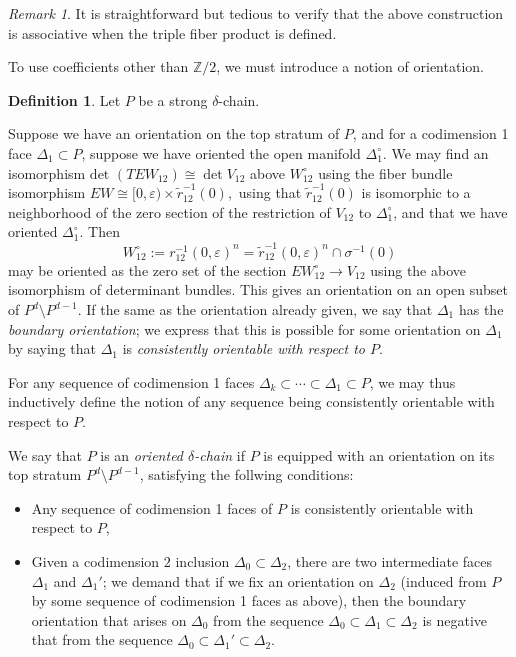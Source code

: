\documentclass{memo-l}
\theoremstyle{definition}
\newtheorem{definition}[theorem]{Definition}
\theoremstyle{remark}
\newtheorem{remark}[theorem]{Remark}
\numberwithin{section}{chapter}
\numberwithin{equation}{chapter}
\begin{document}
\begin{remark}\label{rmk:assoc}
It is straightforward but tedious to verify that the above construction is associative when the triple fiber product is defined. 
\end{remark}

To use coefficients other than $\mathbb Z/2$, we must introduce a notion of orientation.
\begin{definition}Let $P$ be a strong $\delta$-chain.

Suppose we have an orientation on the top stratum of $P$, and for a codimension 1 face $\Delta_1 \subset P$, suppose we have oriented the open manifold $\Delta_1^\circ$. We may find an isomorphism $\text{det }(TEW_{12}) \cong \det{V_{12}}$ above $W_{12}^\circ$ using the fiber bundle isomorphism $EW \cong [0,\varepsilon) \times \tilde r_{12}^{-1}(0),$ using that $\tilde r_{12}^{-1}(0)$ is isomorphic to a neighborhood of the zero section of the restriction of $V_{12}$ to $\Delta_1^\circ$, and that we have oriented $\Delta_1^\circ$. Then
$$W_{12}^\circ := r_{12}^{-1}(0, \varepsilon)^n = \tilde r_{12}^{-1}(0, \varepsilon)^n \cap \sigma^{-1}(0)$$
may be oriented as the zero set of the section $EW_{12}^\circ \to V_{12}$ using the above isomorphism of determinant bundles. This gives an orientation on an open subset of $P^d \setminus P^{d-1}$. If the same as the orientation already given, we say that $\Delta_1$ has the \emph{boundary orientation}; we express that this is possible for some orientation on $\Delta_1$ by saying that $\Delta_1$ is \emph{consistently orientable with respect to $P$}.

For any sequence of codimension 1 faces $\Delta_k \subset \cdots \subset \Delta_1 \subset P$, we may thus inductively define the notion of any sequence being consistently orientable with respect to $P$. 

We say that $P$ is an \emph{oriented $\delta$-chain} if $P$ is equipped with an orientation on its top stratum $P^d \setminus P^{d-1}$, satisfying the follwing conditions:
\begin{itemize}
\item Any sequence of codimension 1 faces of $P$ is consistently orientable with respect to $P$,
\item Given a codimension $2$ inclusion $\Delta_0 \subset \Delta_2$, there are two intermediate faces $\Delta_1$ and $\Delta_1'$; we demand that if we fix an orientation on $\Delta_2$ (induced from $P$ by some sequence of codimension 1 faces as above), then the boundary orientation that arises on $\Delta_0$ from the sequence $\Delta_0 \subset \Delta_1 \subset \Delta_2$ is negative that from the sequence $\Delta_0 \subset \Delta_1' \subset \Delta_2$. 
\end{itemize}
\end{definition}
\end{document}
